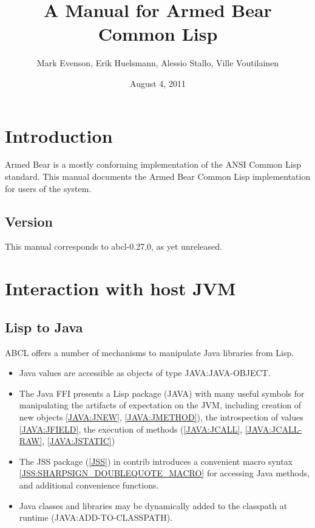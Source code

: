 


\title{A Manual for Armed Bear Common Lisp}
\date{August 4, 2011}
\author{Mark Evenson, Erik Huelsmann, Alessio Stallo, Ville Voutilainen}

\section{Introduction}

Armed Bear is a mostly conforming implementation of the ANSI Common
Lisp standard.  This manual documents the Armed Bear Common Lisp
implementation for users of the system.

\subsection{Version}
This manual corresponds to abcl-0.27.0, as yet unreleased.


\section{Interaction with host JVM}


\subsection{Lisp to Java}

ABCL offers a number of mechanisms to manipulate Java libraries from
Lisp.

\begin{itemize}
\item Java values are accessible as objects of type JAVA:JAVA-OBJECT.
\item The Java FFI presents a Lisp package (JAVA) with many useful
  symbols for manipulating the artifacts of expectation on the JVM,
  including creation of new objects \ref{JAVA:JNEW}, \ref{JAVA:JMETHOD}), the
  introspection of values \ref{JAVA:JFIELD}, the execution of methods
  (\ref{JAVA:JCALL}, \ref{JAVA:JCALL-RAW}, \ref{JAVA:JSTATIC})
\item The JSS package (\ref{JSS}) in contrib introduces a convenient macro
  syntax \ref{JSS:SHARPSIGN_DOUBLEQUOTE_MACRO} for accessing Java
  methods, and additional convenience functions.
\item Java classes and libraries may be dynamically added to the
  classpath at runtime (JAVA:ADD-TO-CLASSPATH).
\end{itemize}

